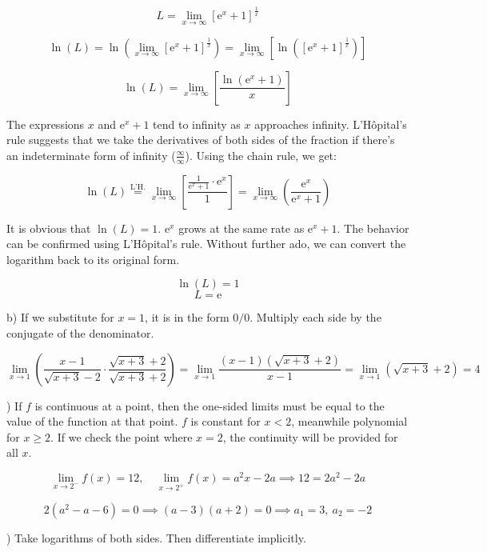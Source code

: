 \documentclass{article}
\begin{document}
\[ L = \lim_{x \to \infty} [\mathrm{e}^x + 1]^{\frac{1}{x}} \]

\[
\ln(L) = \ln\left(\lim_{x \to \infty} [\mathrm{e}^x + 1]^{\frac{1}{x}}\right) = \lim_{x \to \infty} \left[ \ln\left( [\mathrm{e}^x + 1]^{\frac{1}{x}} \right) \right]
\]

\[
\ln(L) = \lim_{x \to \infty} \left[ \frac{\ln(\mathrm{e}^x + 1)}{x}\right]
\]

\hfill

\noindent The expressions $x$ and $\mathrm{e}^x + 1$ tend to infinity as $x$ approaches infinity. L'Hôpital's rule suggests that we take the derivatives of both sides of the fraction if there's an indeterminate form of infinity ($\frac{\infty}{\infty}$). Using the chain rule, we get:

\[\ln(L) \overset{\text{L'H.}}{=} \lim_{x \to \infty} \left[ \frac{\frac{1}{\mathrm{e}^x+1} \cdot \mathrm{e}^x}{1}\right] = \lim_{x \to \infty} \left( \frac{\mathrm{e}^x}{\mathrm{e}^x+1} \right)\]

\hfill

\noindent It is obvious that $\ln(L) = 1$. $\mathrm{e}^x$ grows at the same rate as $\mathrm{e}^x + 1$. The behavior can be confirmed using L'Hôpital's rule. Without further ado, we can convert the logarithm back to its original form.

\[\ln(L) = 1\]
\[\boxed{L = \mathrm{e}}\]

\hfill

\noindent b) If we substitute for $x = 1$, it is in the form $0/0$. Multiply each side by the conjugate of the denominator.

\[
\lim_{x \to 1}\left( \frac{x-1}{\sqrt{x+3} - 2} \cdot \frac{\sqrt{x+3} + 2}{\sqrt{x+3} + 2} \right) = \lim_{x \to 1} \frac{(x-1)(\sqrt{x+3} + 2)}{x-1} = \lim_{x \to 1} (\sqrt{x+3} + 2) = \boxed 4\]

\hfill

) If $f$ is continuous at a point, then the one-sided limits must be equal to the value of the function at that point. $f$ is constant for $x < 2$, meanwhile polynomial for $x \geq 2$. If we check the point where $x=2$, the continuity will be provided for all $x$.

\[\lim_{x\to2^-}f(x)=12,\quad\lim_{x\to2^+}f(x)=a^2x-2a\implies12=2a^2-2a\]

\[2(a^2-a-6)=0\implies(a-3)(a+2)=0\implies\boxed{a_1=3,\:a_2=-2}\]

\hfill

) Take logarithms of both sides. Then differentiate implicitly.
\end{document}
